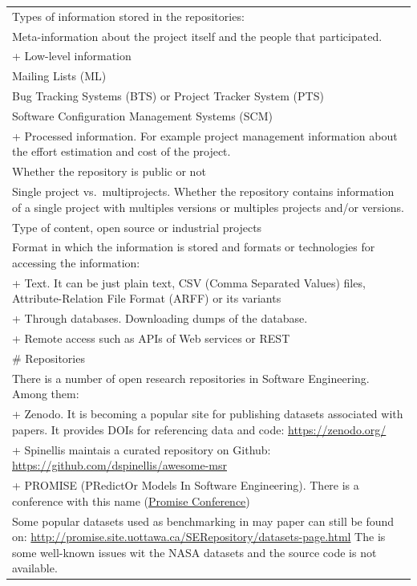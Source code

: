 \documentclass[
]{book}
\begin{document}
\begin{longtable}[]{@{}
  >{\raggedleft\arraybackslash}p{}@{}}
Types of information stored in the repositories: \\
* Meta-information about the project itself and the
people that participated. \\
+ Low-level information \\
* Mailing Lists (ML) \\
* Bug Tracking Systems (BTS) or Project Tracker System (PTS) \\
* Software Configuration Management Systems (SCM) \\
+ Processed information. For example project management information about the effort estimation and cost of the project. \\
* Whether the repository is public or not \\
* Single project vs.~multiprojects. Whether the repository contains information of a single project with multiples versions or multiples projects and/or versions. \\
* Type of content, open source or industrial projects \\
* Format in which the information is stored and formats or technologies for accessing the information: \\
+ Text. It can be just plain text, CSV (Comma Separated Values) files, Attribute-Relation File Format
(ARFF) or its variants \\
+ Through databases. Downloading dumps of the database. \\
+ Remote access such as APIs of Web services or REST \\
\# Repositories \\
There is a number of open research repositories in Software Engineering. Among them: \\
+ Zenodo. It is becoming a popular site for publishing datasets associated with papers. It provides DOIs for referencing data and code:
\url{https://zenodo.org/} \\
+ Spinellis maintais a curated repository on Github:
\url{https://github.com/dspinellis/awesome-msr} \\
+ PROMISE (PRedictOr Models In Software Engineering). There is a conference with this name (\href{https://promiseconf.github.io/}{Promise Conference}) \\
Some popular datasets used as benchmarking in may paper can still be found on:
\url{http://promise.site.uottawa.ca/SERepository/datasets-page.html}
The is some well-known issues wit the NASA datasets and the source code is not available. \\

\end{longtable}
\end{document}
